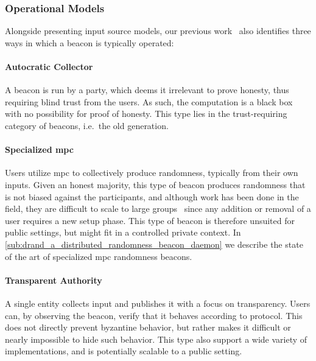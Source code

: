 \subsubsection{Operational Models}
Alongside presenting input source models, our previous work~\cite{worldsbestpaper} also identifies three ways in which a beacon is typically operated:

\paragraph{Autocratic Collector}
A beacon is run by a party, which deems it irrelevant to prove honesty, thus requiring blind trust from the users.
As such, the computation is a black box with no possibility for proof of honesty.
This type lies in the trust-requiring category of beacons, i.e.\ the old generation.

\paragraph{Specialized \acrshort{mpc}}
Users utilize \acrfull{mpc} to collectively produce randomness, typically from their own inputs.
Given an honest majority, this type of beacon produces randomness that is not biased against the participants, and although work has been done in the field, they are difficult to scale to large groups~\cite{cascudo2017scrape, syta2017scalable} since any addition or removal of a user requires a new setup phase.
This type of beacon is therefore unsuited for public settings, but might fit in a controlled private context.
In \vref{sub:drand_a_distributed_randomness_beacon_daemon} we describe the state of the art of specialized \gls{mpc} randomness beacons.

\paragraph{Transparent Authority}
A single entity collects input and publishes it with a focus on transparency.
Users can, by observing the beacon, verify that it behaves according to protocol.
This does not directly prevent byzantine behavior, but rather makes it difficult or nearly impossible to hide such behavior.
This type also support a wide variety of implementations, and is potentially scalable to a public setting.

